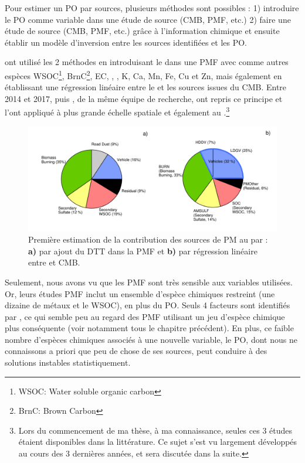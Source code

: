 Pour estimer un PO par sources, plusieurs méthodes sont possibles : 1) introduire le PO
comme variable dans une étude de source (CMB, PMF, etc.) 2) faire une étude de source
(CMB, PMF, etc.) grâce à l'information chimique et ensuite établir un modèle d'inversion
entre les sources identifiées et les PO.

\cite{vermaReactive2014} ont utilisé les 2 méthodes en introduisant le
\PODTT{} dans une PMF avec comme autres espèces WSOC\footnote{WSOC: Water soluble
organic carbon}, BrnC\footnote{BrnC: Brown Carbon}, EC, \SOq, \NHt, K, Ca, Mn, Fe, Cu et
Zn, mais également en établissant une régression linéaire entre le \PODTT{} et les sources
issues du CMB.
Entre 2014 et 2017, \cite{batesReactive2015} puis \cite{fangOxidative2016}, de la même
équipe de recherche, ont repris ce principe et l'ont appliqué à plus grande échelle
spatiale et également au \POAAv.\footnote{Lors du commencement de ma thèse, à ma connaissance, seules ces 3 études étaient
disponibles dans la littérature. Ce sujet s'est vu largement développés au cours des 3
dernières années, et sera discutée dans la suite.}

\begin{figure}[ht]
    \centering
    \includegraphics[width=1.0\linewidth]{figures/chapter04/verma_2014_fig8.pdf}
    \caption{Première estimation de la contribution des sources de PM au \PODTT{} par
        \cite[][figure 8]{vermaReactive2014}: \textbf{a)} par ajout du DTT dans la PMF et
        \textbf{b)} par régression linéaire entre \PODTT{} et CMB.
    }%
    \label{fig:figures/chapter04/verma_2014_fig8}
\end{figure}

Seulement, nous avons vu que les PMF sont très sensible aux variables utilisées. Or, leurs
études PMF inclut un ensemble d'espèce chimiques restreint (une dizaine de métaux et le
WSOC), en plus du PO. Seuls 4 facteurs sont identifiés par \cite{fangOxidative2016}, ce
qui semble peu au regard des PMF utilisant un jeu d'espèce chimique plus conséquente (voir
notamment tous le chapitre précédent). En plus, ce faible nombre d'espèces chimiques
associés à une nouvelle variable, le PO, dont nous ne connaissons a priori que peu de chose de ses
sources, peut conduire à des solutions instables statistiquement.


